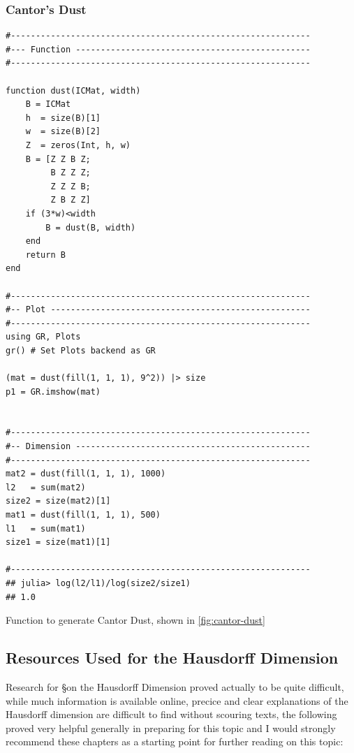 \documentclass[a4paper,11pt,twoside]{article}
\begin{document}
\subsubsection{Cantor's Dust}
\label{sec:org3309aa7}

\begin{listing}[htbp]
\begin{verbatim}
#------------------------------------------------------------
#--- Function -----------------------------------------------
#------------------------------------------------------------

function dust(ICMat, width)
    B = ICMat
    h  = size(B)[1]
    w  = size(B)[2]
    Z  = zeros(Int, h, w)
    B = [Z Z B Z;
         B Z Z Z;
         Z Z Z B;
         Z B Z Z]
    if (3*w)<width
        B = dust(B, width)
    end
    return B
end

#------------------------------------------------------------
#-- Plot ----------------------------------------------------
#------------------------------------------------------------
using GR, Plots
gr() # Set Plots backend as GR

(mat = dust(fill(1, 1, 1), 9^2)) |> size
p1 = GR.imshow(mat)


#------------------------------------------------------------
#-- Dimension -----------------------------------------------
#------------------------------------------------------------
mat2 = dust(fill(1, 1, 1), 1000)
l2   = sum(mat2)
size2 = size(mat2)[1]
mat1 = dust(fill(1, 1, 1), 500)
l1   = sum(mat1)
size1 = size(mat1)[1]

#------------------------------------------------------------
## julia> log(l2/l1)/log(size2/size1)
## 1.0

\end{verbatim}
\caption{\label{l-cant-dust}Function to generate Cantor Dust, shown in \ref{fig:cantor-dust}}
\end{listing}

\subsection{Resources Used for the Hausdorff Dimension}
\label{haus-resource}
Research for \S on the Hausdorff Dimension proved actually to be quite difficult, while much information is available online, precice and clear explanations of the Hausdorff dimension are difficult to find without scouring texts, the following proved very helpful generally in preparing for this topic and I would strongly recommend these chapters as a starting point for further reading on this topic:
\end{document}
